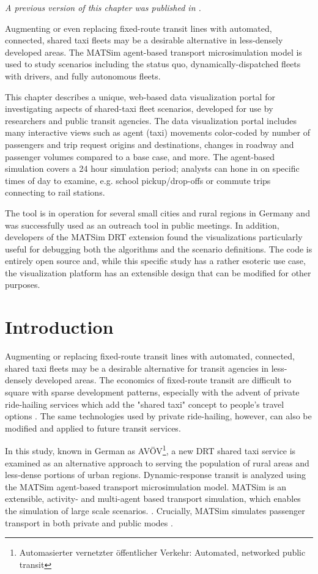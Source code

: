 \emph{A previous version of this chapter was published in
\citet{CharltonLeichKaddoura2021avoev}.}

Augmenting or even replacing fixed-route transit lines with automated, connected, shared taxi fleets may be a desirable alternative in less-densely developed areas. The MATSim agent-based transport microsimulation model is used to study scenarios including the status quo, dynamically-dispatched fleets with drivers, and fully autonomous fleets.

This chapter describes a unique, web-based data visualization portal for investigating aspects of shared-taxi fleet scenarios, developed for use by researchers and public transit agencies. The data visualization portal includes many interactive views such as agent (taxi) movements color-coded by number of passengers and trip request origins and destinations, changes in roadway and passenger volumes compared to a base case, and more. The agent-based simulation covers a 24 hour simulation period; analysts can hone in on specific times of day to examine, e.g. school pickup/drop-offs or commute trips connecting to rail stations.

The tool is in operation for several small cities and rural regions in Germany and was successfully used as an outreach tool in public meetings. In addition, developers of the MATSim DRT extension found the visualizations particularly useful for debugging both the algorithms and the scenario definitions. The code is entirely open source and, while this specific study has a rather esoteric use case, the visualization platform has an extensible design that can be modified for other purposes.

\section{Introduction}
\label{avov-introduction}

Augmenting or replacing fixed-route transit lines with automated, connected, shared taxi fleets may be a desirable alternative for transit agencies in less-densely developed areas. The economics of fixed-route transit are difficult to square with sparse development patterns, especially with the advent of private ride-hailing services which add the "shared taxi" concept to people's travel options \cite{Hough2018}. The same technologies used by private ride-hailing, however, can also be modified and applied to future transit services.

In this study, known in German as AVÖV\footnote{Automasierter vernetzter öffentlicher Verkehr: Automated, networked public transit}, a new \gls{DRT} shared taxi service is examined as an alternative approach to serving the population of rural areas and less-dense portions of urban regions. Dynamic-response transit is analyzed using the \gls{MATSim} agent-based transport microsimulation model. MATSim is an extensible, activity- and multi-agent based transport simulation, which enables the simulation of large scale scenarios. \cite{MATSimBook}. Crucially, MATSim simulates passenger transport in both private and public modes \cite{ZiemkeEtAl2019OpenBerlinScenario}.

